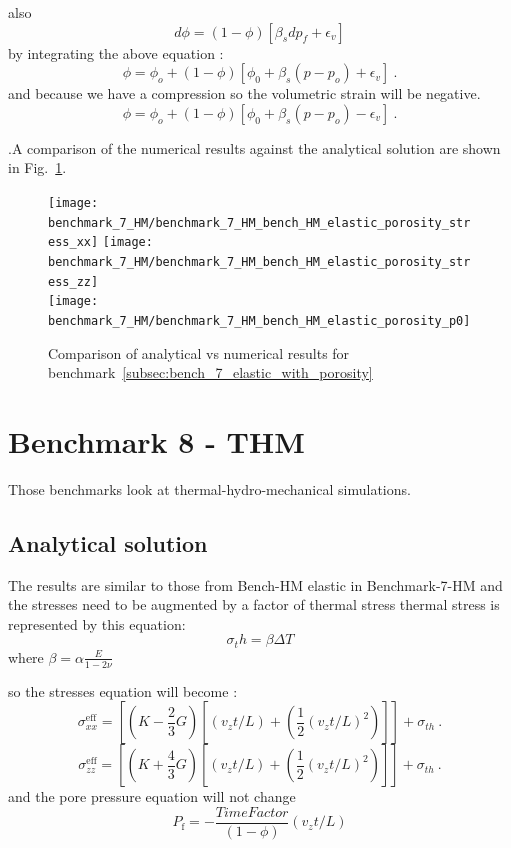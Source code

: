 \documentclass[]{scrreprt}
\begin{document}
\begin{itemize}
	also 
	\begin{equation}
	d\phi=(1-\phi)\left[\beta_s dp_f+\epsilon_v\right]
	\end{equation}
	by integrating the above equation :
	\begin{equation}
\phi = \phi_o+(1-\phi) \left[ \phi_0+\beta_s (p-p_o) + \epsilon_v \right] \ .
\end{equation}
	and because we have a compression so the volumetric strain will be negative.
	\begin{equation}
\phi = \phi_o+(1-\phi) \left[ \phi_0+\beta_s (p-p_o) - \epsilon_v \right] \ .
\end{equation}
	\end{itemize}
\fi
.A comparison of the numerical results against the analytical solution are shown in Fig.~\ref{fig:benchmark7_with_porosity}.
\begin{figure}
  \centering
  \texttt{[image: benchmark\_7\_HM/benchmark\_7\_HM\_bench\_HM\_elastic\_porosity\_stress\_xx]}
  \texttt{[image: benchmark\_7\_HM/benchmark\_7\_HM\_bench\_HM\_elastic\_porosity\_stress\_zz]}\\
  \texttt{[image: benchmark\_7\_HM/benchmark\_7\_HM\_bench\_HM\_elastic\_porosity\_p0]}
  \caption{Comparison of analytical vs numerical results for benchmark~\ref{subsec:bench_7_elastic_with_porosity}}
  \label{fig:benchmark7_with_porosity}  
 \end{figure}

\section{Benchmark 8 - THM}
\label{subsec:bench_8_THM}
Those benchmarks look at thermal-hydro-mechanical simulations.
\subsection{Analytical solution}
The results are similar to those from Bench-HM elastic in Benchmark-7-HM
 and the stresses need to be augmented by a factor of thermal stress
 thermal stress is represented by this equation:
 \begin{equation}
 \sigma_th=\beta\Delta{T}
 \end{equation}
 where $\beta=\alpha\frac{E}{1-2\nu}$
 
 so the stresses equation will become :
 \begin{equation}
\sigma_{xx}^{\mathrm{eff}} =\left[ (K - \mbox{$\frac{2}{3}$}G)\left[\left( v_{z}t/L\right)+\left(\frac{1}{2}\left( v_{z}t/L\right)^2\right) \right]\right]+\sigma_{th} \ . 
\end{equation}
\begin{equation}
\sigma_{zz}^{\mathrm{eff}} =\left[ (K + \mbox{$\frac{4}{3}$}G)\left[\left( v_{z}t/L\right)+\left(\frac{1}{2}\left( v_{z}t/L\right)^2\right) \right]\right]+\sigma_{th} \ .
\end{equation}
and the pore pressure equation will not change 
\begin{equation}
P_{\mathrm{f}} = -\frac{Time Factor}{(1-\phi)}\left( v_{z}t/L\right)
\end{equation}
 
\end{document}

